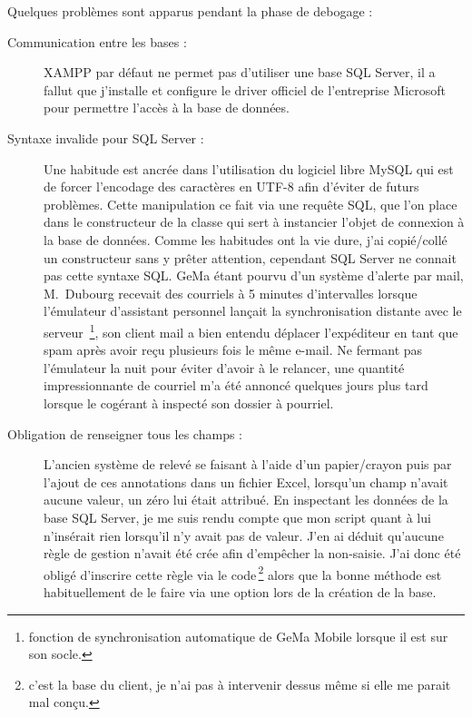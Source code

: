 Quelques problèmes sont apparus pendant la phase de debogage :
\begin{description}

  \item[Communication entre les bases :] XAMPP par défaut ne permet pas
    d'utiliser une base SQL Server, il a fallut que j'installe et
    configure le driver officiel de l'entreprise Microsoft pour
    permettre l'accès à la base de données.

  \item[Syntaxe invalide pour SQL Server :] Une habitude est ancrée dans
    l'utilisation du logiciel libre MySQL qui est de forcer l'encodage
    des caractères en UTF-8 afin d'éviter de futurs problèmes.  Cette
    manipulation ce fait via une requête SQL, que l'on place dans le
    constructeur de la classe qui sert à instancier l'objet de connexion
    à la base de données. Comme les habitudes ont la vie dure, j'ai
    copié/collé un constructeur sans y prêter attention, cependant SQL
    Server ne connait pas cette syntaxe SQL. GeMa étant pourvu d'un
    système d'alerte par mail, M.~Dubourg recevait des courriels à 5
    minutes d'intervalles lorsque l'émulateur d'assistant personnel
    lançait la synchronisation distante avec le serveur\,
    \footnote{fonction de synchronisation automatique de GeMa Mobile
    lorsque il est sur son socle.}, son client mail a bien entendu
    déplacer l'expéditeur en tant que spam après avoir reçu plusieurs
    fois le même e-mail.  Ne fermant pas l'émulateur la nuit pour éviter
    d'avoir à le relancer, une quantité impressionnante de courriel m'a
    été annoncé quelques jours plus tard lorsque le cogérant à inspecté
    son dossier à pourriel.

  \item[Obligation de renseigner tous les champs :] L'ancien système de
    relevé se faisant à l'aide d'un papier/crayon puis par l'ajout de
    ces annotations dans un fichier Excel, lorsqu'un champ n'avait
    aucune valeur, un zéro lui était attribué. En inspectant les données
    de la base SQL Server, je me suis rendu compte que mon script quant
    à lui n'insérait rien lorsqu'il n'y avait pas de valeur. J'en ai
    déduit qu'aucune règle de gestion n'avait été crée afin d'empêcher
    la non-saisie. J'ai donc été obligé d'inscrire cette règle via le
    code\,\footnote{c'est la base du client, je n'ai pas à intervenir
    dessus même si elle me parait mal conçu.} alors que la bonne méthode
    est habituellement de le faire via une option lors de la création de
    la base.

\end{description}
